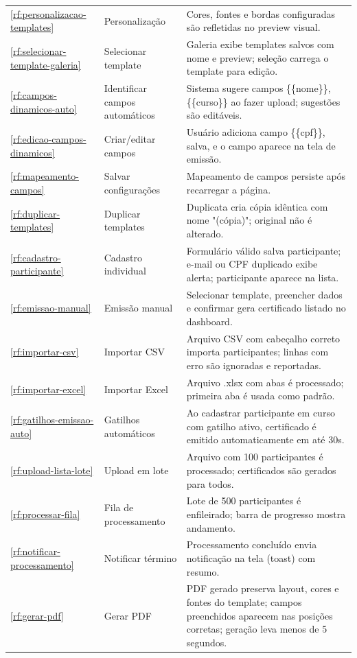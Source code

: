 \begin{longtable}{p{1cm} p{3.2cm} p{10.8cm}}
\ref{rf:personalizacao-templates} & Personalização & Cores, fontes e bordas configuradas são refletidas no preview visual. \\
\ref{rf:selecionar-template-galeria} & Selecionar template & Galeria exibe templates salvos com nome e preview; seleção carrega o template para edição. \\
\ref{rf:campos-dinamicos-auto} & Identificar campos automáticos & Sistema sugere campos \{\{nome\}\}, \{\{curso\}\} ao fazer upload; sugestões são editáveis. \\
\ref{rf:edicao-campos-dinamicos} & Criar/editar campos & Usuário adiciona campo \{\{cpf\}\}, salva, e o campo aparece na tela de emissão. \\
\ref{rf:mapeamento-campos} & Salvar configurações & Mapeamento de campos persiste após recarregar a página. \\
\ref{rf:duplicar-templates} & Duplicar templates & Duplicata cria cópia idêntica com nome "(cópia)"; original não é alterado. \\
\midrule
\ref{rf:cadastro-participante} & Cadastro individual & Formulário válido salva participante; e-mail ou CPF duplicado exibe alerta; participante aparece na lista. \\
\ref{rf:emissao-manual} & Emissão manual & Selecionar template, preencher dados e confirmar gera certificado listado no dashboard. \\
\ref{rf:importar-csv} & Importar CSV & Arquivo CSV com cabeçalho correto importa participantes; linhas com erro são ignoradas e reportadas. \\
\ref{rf:importar-excel} & Importar Excel & Arquivo .xlsx com abas é processado; primeira aba é usada como padrão. \\
\ref{rf:gatilhos-emissao-auto} & Gatilhos automáticos & Ao cadastrar participante em curso com gatilho ativo, certificado é emitido automaticamente em até 30s. \\
\ref{rf:upload-lista-lote} & Upload em lote & Arquivo com 100 participantes é processado; certificados são gerados para todos. \\
\ref{rf:processar-fila} & Fila de processamento & Lote de 500 participantes é enfileirado; barra de progresso mostra andamento. \\
\ref{rf:notificar-processamento} & Notificar término & Processamento concluído envia notificação na tela (toast) com resumo. \\
\midrule
\ref{rf:gerar-pdf} & Gerar PDF & PDF gerado preserva layout, cores e fontes do template; campos preenchidos aparecem nas posições corretas; geração leva menos de 5 segundos. \\

\end{longtable}
